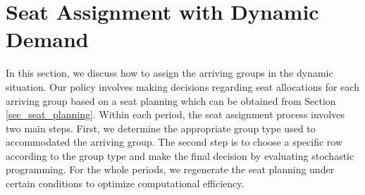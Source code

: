 \section{Seat Assignment with Dynamic Demand}\label{sec_dynamic}




In this section, we discuss how to assign the arriving groups in the dynamic situation. Our policy involves making decisions regarding seat allocations for each arriving group based on a seat planning which can be obtained from Section \ref{sec_seat_planning}. Within each period, the seat assignment process involves two main steps. First, we determine the appropriate group type used to accommodated the arriving group. The second step is to choose a specific row according to the group type and make the final decision by evaluating stochastic programming. For the whole periods, we regenerate the seat planning under certain conditions to optimize computational efficiency.







